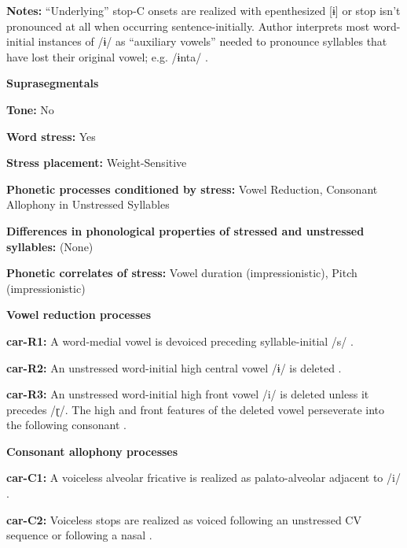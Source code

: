 \textbf{Notes:} “Underlying” stop-C onsets are realized with epenthesized [ɨ] or stop isn’t pronounced at all when occurring sentence-initially. Author interprets most word-initial instances of /ɨ/ as “auxiliary vowels” needed to pronounce syllables that have lost their original vowel; e.g. /ɨnta/ \citep[26]{Courtz2008}.



\textbf{Suprasegmentals}



\textbf{Tone:} No



\textbf{Word stress:} Yes



\textbf{Stress placement:} Weight-Sensitive



\textbf{Phonetic processes conditioned by stress:} Vowel Reduction, Consonant Allophony in Unstressed Syllables



\textbf{Differences in phonological properties of stressed and unstressed syllables:} (None)



\textbf{Phonetic correlates of stress:} Vowel duration (impressionistic), Pitch (impressionistic)



\textbf{Vowel reduction processes}



\textbf{car-R1:} A word-medial vowel is devoiced preceding syllable-initial /s/ \citep[38]{Peasgood1972}.



\textbf{car-R2:} An unstressed word-initial high central vowel /ɨ/ is deleted \citep[40]{Courtz2008}.



\textbf{car-R3:} An unstressed word-initial high front vowel /i/ is deleted unless it precedes /ɽ/. The high and front features of the deleted vowel perseverate into the following consonant \citep[41]{Courtz2008}.



\textbf{Consonant allophony processes}



\textbf{car-C1:} A voiceless alveolar fricative is realized as palato-alveolar adjacent to /i/ \citep[32]{Courtz2008}.



\textbf{car-C2:} Voiceless stops are realized as voiced following an unstressed CV sequence or following a nasal \citep[31]{Courtz2008}.



